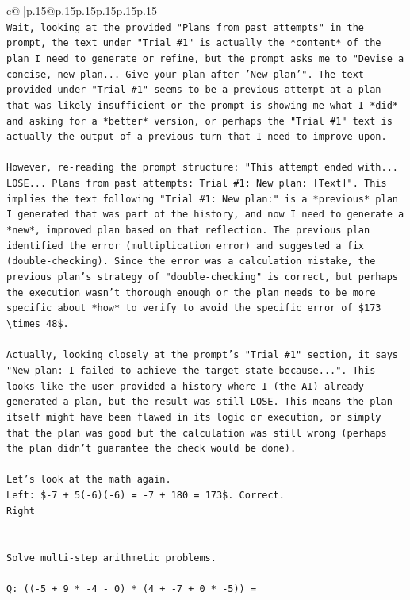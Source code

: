 \documentclass{article}
\begin{document}
{\begin{supertabular}{c@{$\;$}|p{.15\linewidth}@{}p{.15\linewidth}p{.15\linewidth}p{.15\linewidth}p{.15\linewidth}p{.15\linewidth}}
{{{\\ 
\texttt{Wait, looking at the provided "Plans from past attempts" in the prompt, the text under "Trial \#1" is actually the *content* of the plan I need to generate or refine, but the prompt asks me to "Devise a concise, new plan... Give your plan after 'New plan'". The text provided under "Trial \#1" seems to be a previous attempt at a plan that was likely insufficient or the prompt is showing me what I *did* and asking for a *better* version, or perhaps the "Trial \#1" text is actually the output of a previous turn that I need to improve upon.} \\
\\ 
\texttt{However, re{-}reading the prompt structure: "This attempt ended with... LOSE... Plans from past attempts: Trial \#1: New plan: {[}Text{]}". This implies the text following "Trial \#1: New plan:" is a *previous* plan I generated that was part of the history, and now I need to generate a *new*, improved plan based on that reflection. The previous plan identified the error (multiplication error) and suggested a fix (double{-}checking). Since the error was a calculation mistake, the previous plan's strategy of "double{-}checking" is correct, but perhaps the execution wasn't thorough enough or the plan needs to be more specific about *how* to verify to avoid the specific error of \$173 \textbackslash{}times 48\$.} \\
\\ 
\texttt{Actually, looking closely at the prompt's "Trial \#1" section, it says "New plan: I failed to achieve the target state because...". This looks like the user provided a history where I (the AI) already generated a plan, but the result was still LOSE. This means the plan itself might have been flawed in its logic or execution, or simply that the plan was good but the calculation was still wrong (perhaps the plan didn't guarantee the check would be done).} \\
\\ 
\texttt{Let's look at the math again.} \\
\texttt{Left: \${-}7 + 5({-}6)({-}6) = {-}7 + 180 = 173\$. Correct.} \\
\texttt{Right} \\
\\ 
\\ 
\texttt{Solve multi{-}step arithmetic problems.} \\
\\ 
\texttt{Q: (({-}5 + 9 * {-}4 {-} 0) * (4 + {-}7 + 0 * {-}5)) =} \\
}}}
\end{supertabular}}
\end{document}
